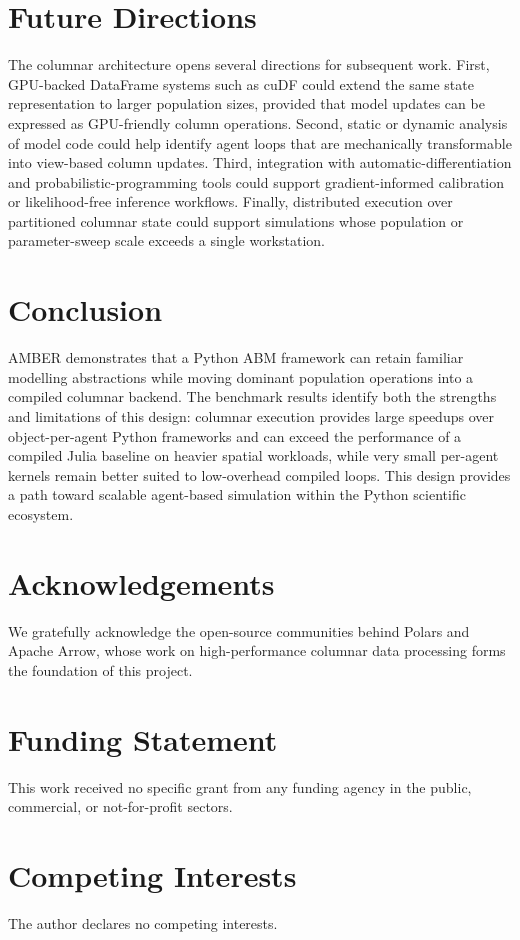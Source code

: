 \documentclass[11pt,a4paper]{article}
\begin{document}
\section{Future Directions}

The columnar architecture opens several directions for subsequent work. First, GPU-backed DataFrame systems such as cuDF could extend the same state representation to larger population sizes, provided that model updates can be expressed as GPU-friendly column operations. Second, static or dynamic analysis of model code could help identify agent loops that are mechanically transformable into view-based column updates. Third, integration with automatic-differentiation and probabilistic-programming tools could support gradient-informed calibration or likelihood-free inference workflows. Finally, distributed execution over partitioned columnar state could support simulations whose population or parameter-sweep scale exceeds a single workstation.

\section{Conclusion}

AMBER demonstrates that a Python ABM framework can retain familiar modelling abstractions while moving dominant population operations into a compiled columnar backend. The benchmark results identify both the strengths and limitations of this design: columnar execution provides large speedups over object-per-agent Python frameworks and can exceed the performance of a compiled Julia baseline on heavier spatial workloads, while very small per-agent kernels remain better suited to low-overhead compiled loops. This design provides a path toward scalable agent-based simulation within the Python scientific ecosystem.

\section*{Acknowledgements}

We gratefully acknowledge the open-source communities behind Polars and Apache Arrow, whose work on high-performance columnar data processing forms the foundation of this project.

\section*{Funding Statement}

This work received no specific grant from any funding agency in the public, commercial, or not-for-profit sectors.

\section*{Competing Interests}

The author declares no competing interests.



\end{document}
